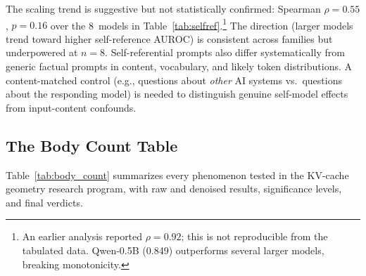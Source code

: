 \documentclass[11pt,a4paper]{article}
\begin{document}
The scaling trend is suggestive but not statistically confirmed:
Spearman $\rho = 0.55$, $p = 0.16$ over the 8~models in
Table~\ref{tab:selfref}.\footnote{An earlier analysis reported
$\rho = 0.92$; this is not reproducible from the tabulated data.
Qwen-0.5B (0.849) outperforms several larger models, breaking
monotonicity.} The direction (larger models trend toward higher
self-reference AUROC) is consistent across families but underpowered
at $n = 8$. Self-referential prompts also differ systematically from
generic factual prompts in content, vocabulary, and likely token
distributions. A content-matched control (e.g., questions about \emph{other}
AI systems vs.\ questions about the responding model) is needed to
distinguish genuine self-model effects from input-content confounds.

\subsection{The Body Count Table}
\label{sec:body_count}

Table~\ref{tab:body_count} summarizes every phenomenon tested in the KV-cache
geometry research program, with raw and denoised results, significance levels,
and final verdicts.
\end{document}
